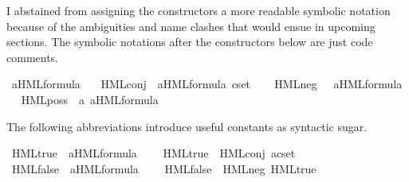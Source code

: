 \begin{isabellebody}
\begin{isamarkuptext}
I abstained from assigning the constructors a more readable symbolic notation because of the ambiguities and name clashes that would ensue in upcoming sections. The symbolic notations after the constructors below are just code comments.%
\end{isamarkuptext}\isamarkuptrue%
\isamarkupfalse%
\ {\isacharparenleft}{\kern0pt}{\isacharprime}{\kern0pt}a{\isacharparenright}{\kern0pt}HML{\isacharunderscore}{\kern0pt}formula\ {\isacharequal}{\kern0pt}\isanewline
\ \ HML{\isacharunderscore}{\kern0pt}conj\ \ {\isacartoucheopen}{\isacharparenleft}{\kern0pt}{\isacharprime}{\kern0pt}a{\isacharparenright}{\kern0pt}HML{\isacharunderscore}{\kern0pt}formula\ cset{\isacartoucheclose}\ %
\isamarkupcmt{$\bigwedge \Phi$%
}\ \isanewline
{\isacharbar}{\kern0pt}\ HML{\isacharunderscore}{\kern0pt}neg\ \ \ {\isacartoucheopen}{\isacharparenleft}{\kern0pt}{\isacharprime}{\kern0pt}a{\isacharparenright}{\kern0pt}HML{\isacharunderscore}{\kern0pt}formula{\isacartoucheclose}\ %
\isamarkupcmt{$\neg\varphi$%
}\ \isanewline
{\isacharbar}{\kern0pt}\ HML{\isacharunderscore}{\kern0pt}poss\ \ {\isacartoucheopen}{\isacharprime}{\kern0pt}a{\isacartoucheclose}\ {\isacartoucheopen}{\isacharparenleft}{\kern0pt}{\isacharprime}{\kern0pt}a{\isacharparenright}{\kern0pt}HML{\isacharunderscore}{\kern0pt}formula{\isacartoucheclose}\ %
\isamarkupcmt{$\langle\alpha\rangle\varphi$%
}%
\begin{isamarkuptext}%
The following abbreviations introduce useful constants as syntactic sugar.%
\end{isamarkuptext}\isamarkuptrue%
\isamarkupfalse%
\ HML{\isacharunderscore}{\kern0pt}true\ {\isacharcolon}{\kern0pt}{\isacharcolon}{\kern0pt}\ {\isacartoucheopen}{\isacharparenleft}{\kern0pt}{\isacharprime}{\kern0pt}a{\isacharparenright}{\kern0pt}HML{\isacharunderscore}{\kern0pt}formula{\isacartoucheclose}\ %
\isanewline
\ \ \ {\isacartoucheopen}HML{\isacharunderscore}{\kern0pt}true\ {\isasymequiv}\ HML{\isacharunderscore}{\kern0pt}conj\ {\isacharparenleft}{\kern0pt}acset\ {\isasymemptyset}{\isacharparenright}{\kern0pt}{\isacartoucheclose}\isanewline
{}\isamarkupfalse%
\ HML{\isacharunderscore}{\kern0pt}false\ {\isacharcolon}{\kern0pt}{\isacharcolon}{\kern0pt}\ {\isacartoucheopen}{\isacharparenleft}{\kern0pt}{\isacharprime}{\kern0pt}a{\isacharparenright}{\kern0pt}HML{\isacharunderscore}{\kern0pt}formula{\isacartoucheclose}\ %
\isanewline
\ \ \ {\isacartoucheopen}HML{\isacharunderscore}{\kern0pt}false\ {\isasymequiv}\ HML{\isacharunderscore}{\kern0pt}neg\ HML{\isacharunderscore}{\kern0pt}true{\isacartoucheclose}\isanewline

\end{isabellebody}
